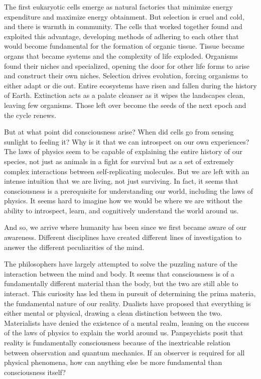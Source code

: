 \documentclass[12pt, AofM.tex]{subfiles}
\begin{document}
The first eukaryotic cells emerge as natural factories that minimize energy expenditure and maximize energy obtainment. But selection is cruel and cold, and there is warmth in community. The cells that worked together found and exploited this advantage, developing methods of adhering to each other that would become fundamental for the formation of organic tissue. Tissue became organs that became systems and the complexity of life exploded. Organisms found their niches and specialized, opening the door for other life forms to arise and construct their own niches. Selection drives evolution, forcing organisms to either adapt or die out. Entire ecosystems have risen and fallen during the history of Earth. Extinction acts as a palate cleanser as it wipes the landscapes clean, leaving few organisms. Those left over become the seeds of the next epoch and the cycle renews.

But at what point did consciousness arise? When did cells go from sensing sunlight to feeling it?  Why is it that we can introspect on our own experiences? The laws of physics seem to be capable of explaining the entire history of our species, not just as animals in a fight for survival but as a set of extremely complex interactions between self-replicating molecules. But we are left with an intense intuition that we are living, not just surviving. In fact, it seems that consciousness is a prerequisite for understanding our world, including the laws of physics. It seems hard to imagine how we would be where we are without the ability to introspect, learn, and cognitively understand the world around us.

And so, we arrive where humanity has been since we first became aware of our awareness. Different disciplines have created different lines of investigation to answer the different peculiarities of the mind.

The philosophers have largely attempted to solve the puzzling nature of the interaction between the mind and body. It seems that consciousness is of a fundamentally different material than the body, but the two are still able to interact. This curiosity has led them in pursuit of determining the prima materia, the fundamental nature of our reality. Dualists have proposed that everything is either mental or physical, drawing a clean distinction between the two. Materialists have denied the existence of a mental realm, leaning on the success of the laws of physics to explain the world around us. Panpsychists posit that reality is fundamentally consciousness because of the inextricable relation between observation and quantum mechanics. If an observer is required for all physical phenomena, how can anything else be more fundamental than consciousness itself?
\end{document}
